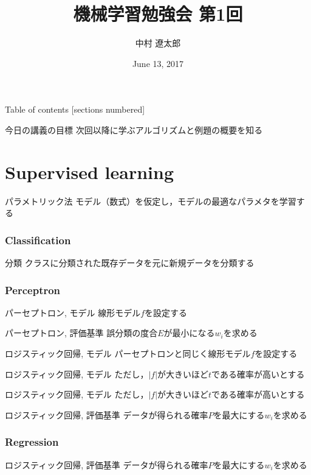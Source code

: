 \documentclass[dvipdfmx,platex]{beamer}
\title{{\mgfamily 機械学習勉強会 第1回}}
\date{June 13, 2017}
\author{{\mgfamily 中村 遼太郎}}
\institute{}
\begin{document}
\mgfamily
\maketitle
\begin{frame}{Table of contents}
  [sections numbered]
  \tableofcontents[hideallsubsections]
\end{frame}

\begin{frame}[fragile]{{\mgfamily 今日の講義の目標}}
次回以降に学ぶアルゴリズムと例題の概要を知る
\end{frame}
\part{Supervised learning}
\begin{frame}{パラメトリック法}
  モデル（数式）を仮定し，モデルの最適なパラメタを学習する
\end{frame}
\section{Classification}
\begin{frame}{分類}
  クラスに分類された既存データを元に新規データを分類する
\end{frame}
\section{Perceptron}
\begin{frame}{パーセプトロン, モデル}
  線形モデル$f$を設定する
\end{frame}
\begin{frame}{パーセプトロン, 評価基準}
  誤分類の度合$E$が最小になる$w_i$を求める
\end{frame}
\begin{frame}{ロジスティック回帰, モデル}
  パーセプトロンと同じく線形モデル$f$を設定する
\end{frame}
\begin{frame}{ロジスティック回帰, モデル}
  ただし，$|f|$が大きいほど$t$である確率が高いとする
\end{frame}
\begin{frame}{ロジスティック回帰, モデル}
  ただし，$|f|$が大きいほど$t$である確率が高いとする
\end{frame}
\begin{frame}{ロジスティック回帰, 評価基準}
  データが得られる確率$P$を最大にする$w_i$を求める
\end{frame}
\section{Regression}
\begin{frame}{ロジスティック回帰, 評価基準}
  データが得られる確率$P$を最大にする$w_i$を求める
\end{frame}
\end{document}

